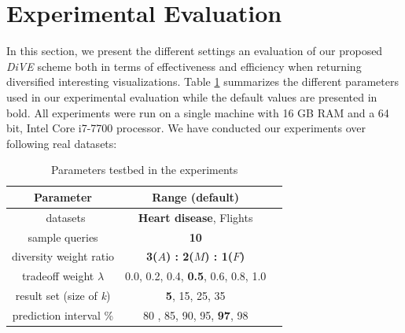 
\section{Experimental Evaluation}\label{sec:experimental_testbed}

In this section, we present the different settings an evaluation of our proposed {\em DiVE} scheme both in terms of effectiveness and efficiency when returning diversified interesting visualizations. 
%
Table \ref{tab:tab-parameter} summarizes the different parameters used in our experimental evaluation while the default values are presented in bold.  All experiments were run on a single machine with 16 GB RAM and a 64 bit, Intel Core i7-7700 processor. We have conducted our experiments over following real datasets:


\begin{table}
	\caption{Parameters testbed in the experiments}
	\label{tab:tab-parameter}
	\begin{tabular}{ccl}
		\toprule
		Parameter &Range (\textbf{default})\\
		\midrule\
		datasets & \textbf{Heart disease}, Flights\\
		sample queries & \textbf{10} \\
		diversity weight ratio & \textbf{3($ A $) : 2($ M $) : 1($ F $)} \\
		tradeoff weight $ \lambda $ & 0.0, 0.2, 0.4, \textbf{0.5}, 0.6, 0.8, 1.0 \\
		result set (size of \textit{k}) & \textbf{5}, 15, 25, 35\\
		prediction interval \% & 80 , 85, 90, 95, \textbf{97}, 98\\
		\bottomrule
	\end{tabular}
\end{table}

